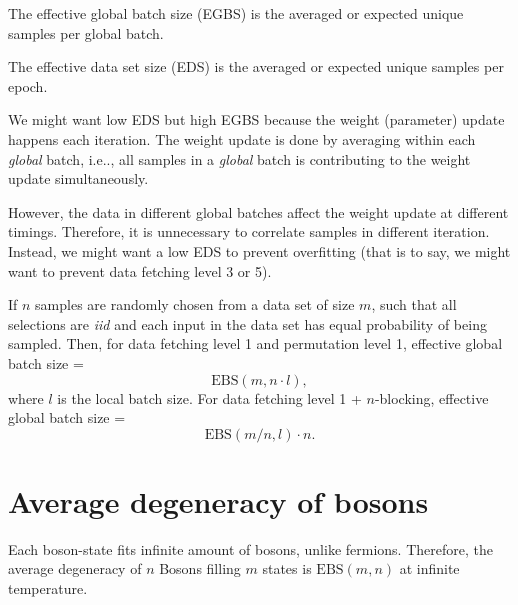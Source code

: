 \documentclass[12pt, letterpaper]{article}
\makeatletter
\newcommand\ie{i.e\@ifnextchar.{}{.\@}}
\theoremstyle{definition}
\theoremstyle{remark}
\newcommand{\EBS}{\mathrm{EBS}}
\makeatother
\begin{document}
	The effective global batch size (EGBS) is the averaged or expected unique samples per global batch.
	
	The effective data set size (EDS) is the  averaged or expected unique samples per epoch.
	
	We might want low EDS but high EGBS because the weight (parameter) update happens each iteration.
	The weight update is done by averaging within each \textit{global} batch, \ie,
	all samples in a \textit{global} batch is contributing to the weight update simultaneously.
	
	However, the data in different global batches affect the weight update at different timings.
	Therefore, it is unnecessary to correlate samples in different iteration. Instead,
	we might want a low EDS to prevent overfitting (that is to say, we might want to prevent data fetching level 3 or 5).
	
	If $n$ samples are randomly chosen from a data set of size $m$, such that all selections
	are \textit{iid} and each input in the data set has equal probability of being sampled.
	Then,
	for data fetching level 1 and permutation level 1, effective global batch size = \[\mathrm{EBS}(m,n\cdot l),\]
	where $l$ is the local batch size.
	For data fetching level 1 + $n$-blocking, effective global batch size =  \[\mathrm{EBS}(m/n,l)\cdot n.\]
	
	\section{Average degeneracy of bosons}
	Each boson-state fits infinite amount of bosons, unlike fermions. Therefore,
	the average degeneracy of $n$ Bosons filling $m$ states is $\EBS(m,n)$ at infinite temperature.
\end{document}
